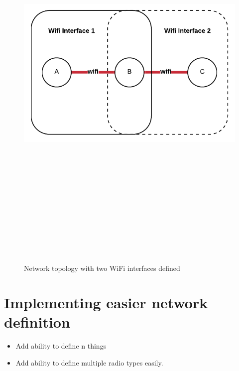 \begin{figure}
    \begin{centering}
        \includegraphics[width=14cm,height=20cm,keepaspectratio]{Figures/networkWifiInterface2.png}
        \caption{Network topology with two WiFi interfaces defined}
        \label{fig:networkWifi2}
    \end{centering}
\end{figure}


\section{Implementing easier network definition}
\begin{itemize}
    \item Add ability to define {n} things
    \item Add ability to define multiple radio types easily.
\end{itemize}

